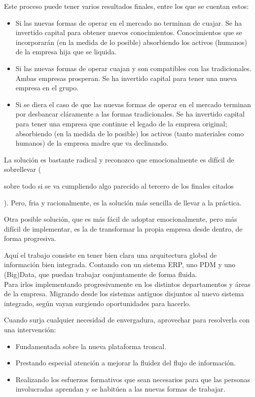\documentclass[11pt,a4paper]{article}
\begin{document}
Este proceso puede tener varios resultados finales, entre los que se cuentan estos:
\begin{itemize}
\item Si las nuevas formas de operar en el mercado no terminan de cuajar. Se ha invertido capital para obtener nuevos conocimientos. Conocimientos que se incorporarán (en la medida de lo posible) absorbiendo los activos (humanos) de la empresa hija que se liquida.
\item Si las nuevas formas de operar cuajan y son compatibles con las tradicionales. Ambas empresas prosperan. Se ha invertido capital para tener una nueva empresa en el grupo.
\item Si se diera el caso de que las nuevas formas de operar en el mercado terminan por desbancar cláramente a las formas tradicionales. Se ha invertido capital para tener una empresa que continue el legado de la empresa original; absorbiendo (en la medida de lo posible) los activos (tanto materiales como humanos) de la empresa madre que va declinando.
\end{itemize}

\vspace{0.5cm}

La solución es bastante radical y reconozco que emocionalmente es difícil de sobrellevar (\begin{footnotesize}sobre todo si se va cumpliendo algo parecido al tercero de los finales citados\end{footnotesize}). Pero, fria y racionalmente, es la solución más sencilla de llevar a la práctica.

\vspace{0.5cm}

Otra  posible solución, que es más fácil de adoptar emocionalmente, pero más difícil de implementar, es la de transformar la propia empresa desde dentro, de forma progresiva. 

Aquí el trabajo consiste en tener bien clara una arquitectura global de información bien integrada. Contando con un sistema ERP, uno PDM y uno (Big)Data, que puedan trabajar conjuntamente de forma fluida. 
\\Para irlos implementando progresivamente en los distintos departamentos y áreas de la empresa. Migrando desde los sistemas antiguos disjuntos al nuevo sistema integrado, según vayan surgiendo oportunidades para hacerlo.

Cuando surja cualquier necesidad de envergadura, aprovechar para resolverla con una intervención:
\begin{itemize}
\item Fundamentada sobre la nueva plataforma troncal.
\item Prestando especial atención a mejorar la fluidez del flujo de información.
\item Realizando los esfuerzos formativos que sean necesarios para que las personas involucradas aprendan y se habitúen a las nuevas formas de trabajar.
\end{itemize}
\end{document}
